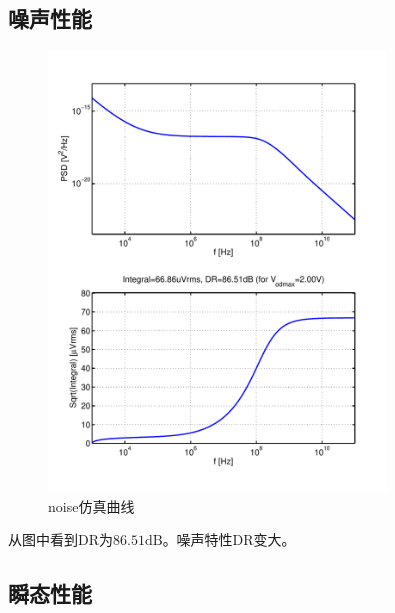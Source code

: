 \documentclass[a4paper]{article}
\newcommand{\udB}{\si{\deci\bel}}
\begin{document}
\subsection{噪声性能}
\begin{figure}[htb]
    \begin{center}
        \includegraphics[width=0.8\textwidth]{fast/noise.pdf}
    \end{center}
    \caption{noise仿真曲线}
    \label{fastnoise}
\end{figure}
从图中看到DR为$86.51\udB$。噪声特性DR变大。
\newpage
\clearpage
\subsection{瞬态性能}
\end{document}
